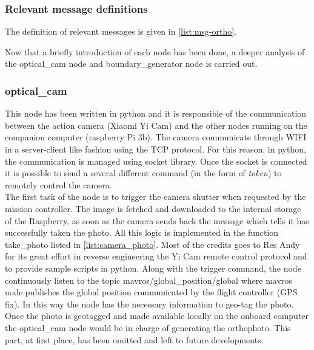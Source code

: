 \subsubsection{Relevant message definitions} %
\label{ssub:relevant_message_definitions}
The definition of relevant messages is given in \autoref{list:msg-ortho}.
\par

Now that a briefly introduction of each node has been done, a deeper analysis of the \textsf{optical\_cam} node and \textsf{boundary\_generator} node is carried out.


\subsubsection{optical\_cam} %
\label{ssub:optical_cam}
This node has been written in python and it is responsible of the communication between the action camera (Xiaomi Yi Cam) and the other nodes running on the companion computer (raspberry Pi 3b). The camera communicate through WIFI in a server-client like fashion using the TCP protocol. For this reason, in python, the communication is managed using \textsf{socket} library.
Once the socket is connected it is possible to send a several different command (in the form of \textit{token}) to remotely control the camera.\\
The first task of the node is to trigger the camera shutter when requested by the mission controller. The image is fetched and downloaded to the internal storage of the Raspberry, as soon as the camera sends back the message which tells it has successfully taken the photo. All this logic is implemented in the function \textsf{take\_photo} listed in \autoref{list:camera_photo}. Most of the credits goes to Res Andy for its great effort in reverse engineering the Yi Cam remote control protocol and to provide sample scripts in python. \cite{YiCamGit}
Along with the trigger command, the node continuously listen to the topic \textsf{mavros/global\_position/global} where mavros node publishes the global position communicated by the flight controller (GPS fix). In this way the node has the necessary information to geo-tag the photo.
Once the photo is geotagged and made available locally on the onboard computer the \textsf{optical\_cam} node would be in charge of generating the orthophoto. This part, at first place, has been omitted and left to future developments.


